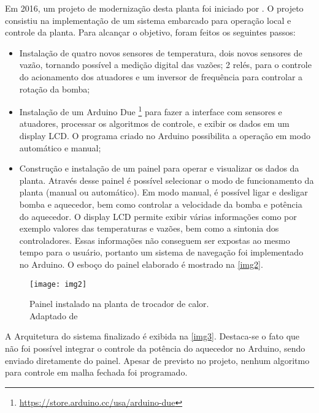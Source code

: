 			
		Em 2016, um projeto de modernização desta planta foi iniciado por \cite{luiz2016}.  O projeto consistiu na implementação de um sistema embarcado para operação local e controle da planta. Para alcançar o objetivo, foram feitos os seguintes passos:
		\begin{itemize}
			\item 
			Instalação de quatro novos sensores de temperatura, dois novos sensores de vazão, tornando possível a medição digital das vazões; 2 relés, para o controle do acionamento dos atuadores e um inversor de frequência para controlar a rotação da bomba;
			\item 
			Instalação de um Arduino Due \footnote{\url{https://store.arduino.cc/usa/arduino-due}} para fazer a interface com sensores e atuadores, processar os algoritmos de controle, e exibir os dados em um display LCD. O programa criado no Arduino possibilita a operação em modo automático e manual;
			\item 
			Construção e instalação de um painel para operar e visualizar os dados da planta. Através desse painel é possível selecionar o modo de funcionamento da planta (manual ou automático). Em modo manual, é possível ligar e desligar bomba e aquecedor, bem como controlar a velocidade da bomba e potência do aquecedor. O display LCD permite exibir várias informações como por exemplo valores das temperaturas e vazões, bem como a sintonia dos controladores. Essas informações não conseguem ser expostas ao mesmo tempo para o usuário, portanto um sistema de navegação foi implementado no Arduino. O esboço do painel elaborado é mostrado na \autoref{img2}.
		\end{itemize}
			
			\begin{figure}[!htb]	
				\captionsetup{justification=centering}
				\begin{center}
					\texttt{[image: img2]}  %
					\caption[Painel instalado na planta de trocador de calor]{\label{img2}Painel instalado na planta de trocador de calor. \\Adaptado de \cite{luiz2016}}
				\end{center}		
			\end{figure}
		
			A Arquitetura do sistema finalizado é exibida na \autoref{img3}. Destaca-se o fato que não foi possível integrar o controle da potência do aquecedor no Arduino, sendo enviado diretamente do painel. Apesar de previsto no projeto, nenhum algoritmo para controle em malha fechada foi programado.
		
